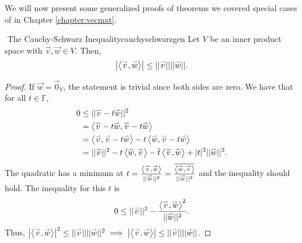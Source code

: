         We will now present some generalized proofs of theorems we covered special cases of in Chapter \ref{chapter:vecmat}. 
        \begin{theorem}{\Stop\,\,The Cauchy-Schwarz Inequality}{cauchyschwarzgen}
            Let \(V\) be an inner product space with \(\vec{v},\vec{w}\in V\). Then,
            \begin{equation*}
                \left|\iprod{\vec{v}}{\vec{w}}\right|\leq||\vec{v}||||\vec{w}||.
            \end{equation*}
            \begin{proof}
                If \(\vec{w}=\vec{0}_V\), the statement is trivial since both sides are zero. We have that for all \(t\in\mathbb{F}\),
                \begin{align*}
                    0&\leq||\vec{v}-t\vec{w}||^2 \\
                    &=\iprod{\vec{v}-t\vec{w}}{\vec{v}-t\vec{w}} \\
                    &=\iprod{\vec{v}}{\vec{v}-t\vec{w}}-t\iprod{\vec{w}}{\vec{v}-t\vec{w}} \\
                    &=||\vec{v}||^2-t\iprod{\vec{w}}{\vec{v}}-\bar{t}\iprod{\vec{v}}{\vec{w}}+|t|^2||\vec{w}||^2.
                \end{align*}
                The quadratic has a minimum at \(t=\frac{\iprod{\vec{v}}{\vec{w}}}{||\vec{w}||^2}=\frac{\bar{\iprod{\vec{w}}{\vec{v}}}}{||\vec{w}||^2}\) and the inequality should hold. The inequality for this \(t\) is
                \begin{equation*}
                    0\leq||\vec{v}||^2-\frac{\iprod{\vec{v}}{\vec{w}}^2}{||\vec{w}||^2}.
                \end{equation*}
                Thus, \(\left|\iprod{\vec{v}}{\vec{w}}\right|^2\leq||\vec{v}||||\vec{w}||^2\implies\left|\iprod{\vec{v}}{\vec{w}}\right|\leq||\vec{v}||||\vec{w}||\).
            \end{proof}
        \end{theorem}
        \pagebreak
